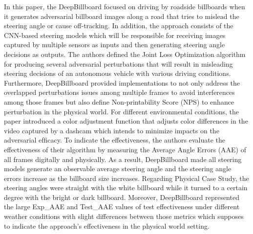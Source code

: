 \documentclass[10pt,a4paper]{report}
\begin{document}
In this paper, the DeepBillboard focused on driving by roadside billboards when it generates adversarial billboard images along a road that tries to mislead the steering angle or cause off-tracking.
%
In addition, the approach consists of the CNN-based steering models which will be responsible for receiving images captured by multiple sensors as inputs and then generating steering angle decisions as outputs.
%
The authors defined the Joint Loss Optimization algorithm for producing several adversarial perturbations that will result in misleading steering decisions of an autonomous vehicle with various driving conditions.
%
Furthermore, DeepBillboard provided implementations to not only address the overlapped perturbations issues among multiple frames to avoid interferences among those frames but also define Non-printability Score (NPS) to enhance perturbation in the physical world.
%
For different environmental conditions, the paper introduced a color adjustment function that adjusts color differences in the video captured by a dashcam which intends to minimize impacts on the adversarial efﬁcacy.
%
To indicate the effectiveness, the authors evaluate the effectiveness of their algorithm by measuring the Average Angle Errors (AAE) of all frames digitally and physically.
%
As a result, DeepBillboard made all steering models generate an observable average steering angle and the steering angle errors increase as the billboard size increases.
%
Regarding Physical Case Study, the steering angles were straight with the white billboard while it turned to a certain degree with the bright or dark billboard.
%
Moreover, DeepBillboard represented the large Exp\_AAE and Test\_AAE values of test effectiveness under different weather conditions with slight differences between those metrics which supposes to indicate the approach’s effectiveness in the physical world setting.
\end{document}
